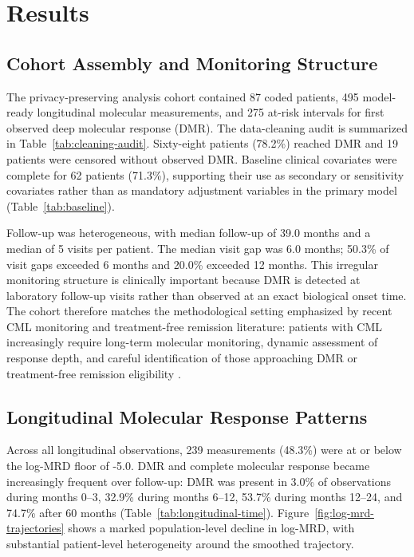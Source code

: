 \section{Results}

\subsection{Cohort Assembly and Monitoring Structure}

The privacy-preserving analysis cohort contained 87 coded patients, 495 model-ready longitudinal molecular measurements, and 275 at-risk intervals for first observed deep molecular response (DMR). The data-cleaning audit is summarized in Table~\ref{tab:cleaning-audit}. Sixty-eight patients (78.2\%) reached DMR and 19 patients were censored without observed DMR. Baseline clinical covariates were complete for 62 patients (71.3\%), supporting their use as secondary or sensitivity covariates rather than as mandatory adjustment variables in the primary model (Table~\ref{tab:baseline}).





Follow-up was heterogeneous, with median follow-up of 39.0 months and a median of 5 visits per patient. The median visit gap was 6.0 months; 50.3\% of visit gaps exceeded 6 months and 20.0\% exceeded 12 months. This irregular monitoring structure is clinically important because DMR is detected at laboratory follow-up visits rather than observed at an exact biological onset time. The cohort therefore matches the methodological setting emphasized by recent CML monitoring and treatment-free remission literature: patients with CML increasingly require long-term molecular monitoring, dynamic assessment of response depth, and careful identification of those approaching DMR or treatment-free remission eligibility \cite{Jabbour2025JAMAReview,Haddad2026Algorithms,Rasekh2026TFRPredictor,Ono2026MR45,Takahashi2026JSKI,Verweij2026RemoteMonitoring}.

\subsection{Longitudinal Molecular Response Patterns}

Across all longitudinal observations, 239 measurements (48.3\%) were at or below the log-MRD floor of -5.0. DMR and complete molecular response became increasingly frequent over follow-up: DMR was present in 3.0\% of observations during months 0--3, 32.9\% during months 6--12, 53.7\% during months 12--24, and 74.7\% after 60 months (Table~\ref{tab:longitudinal-time}). Figure~\ref{fig:log-mrd-trajectories} shows a marked population-level decline in log-MRD, with substantial patient-level heterogeneity around the smoothed trajectory.

